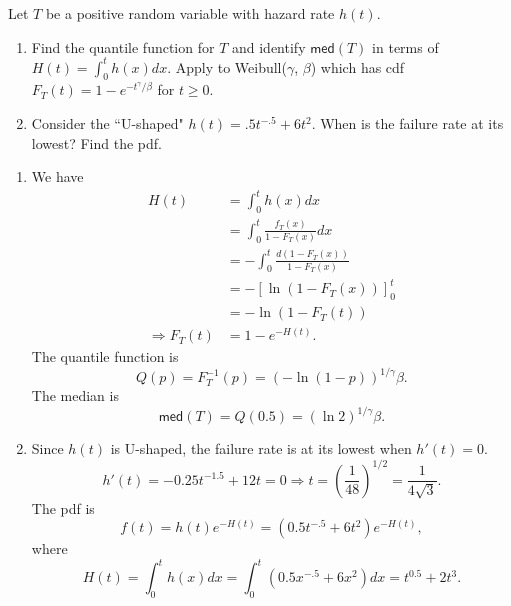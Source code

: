 \documentclass[12pt]{article}
\newenvironment{problem}[2][Problem]{\begin{trivlist}
\item[\hskip \labelsep {\bfseries #1}\hskip \labelsep {\bfseries #2.}]}
{\end{trivlist}}
\begin{document}
\begin{problem}{3}
  Let $T$ be a positive random variable with hazard rate $h(t)$.
  \begin{enumerate}
    \item Find the quantile function for $T$ and identify 
    $\mathsf{med}(T)$ in terms of $H(t) = \int_0^t h(x)dx$.
    Apply to Weibull($\gamma$, $\beta$) which has cdf 
    $F_T(t) = 1 - e^{-t^{\gamma} / \beta}$ for $t \geq 0$.
    \item Consider the ``U-shaped" $h(t) = .5t^{-.5} + 6t^2$. 
    When is the failure rate at its lowest? Find
    the pdf.
  \end{enumerate}

  \begin{enumerate}
    \item We have
    \[
      \begin{aligned}
        H(t) &= \int_0^t h(x) dx\\
        &= \int_0^t \frac{f_T(x)}{1 - F_T(x)} dx \\
        &= -\int_0^t \frac{d(1 - F_T(x))}{1 - F_T(x)} \\
        &= -\left[ \ln(1 - F_T(x)) \right]_0^t \\ 
        &= -\ln(1 - F_T(t)) \\
        \Rightarrow F_T(t) &= 1 - e^{-H(t)}.
      \end{aligned}
    \]
    The quantile function is
    \[
      Q(p) = F_T^{-1}(p) = \left( -\ln(1 - p) \right)^{1/\gamma} \beta.
    \]
    The median is
    \[
      \mathsf{med}(T) = Q(0.5) = (\ln 2)^{1/\gamma} \beta.
    \]
    \item Since $h(t)$ is U-shaped, the failure rate is at its lowest 
    when $h'(t) = 0$.
    \[
      h'(t) = -0.25 t^{-1.5} + 12t = 0 \Rightarrow t = \left( \frac{1}{48} 
      \right)^{1/2} = \frac{1}{4\sqrt{3}}.
    \]
    The pdf is
    \[
      f(t) = h(t) e^{-H(t)} = \left( 0.5t^{-.5} + 6t^2 \right) e^{-H(t)},
    \]
    where
    \[
      H(t) = \int_0^t h(x) dx = \int_0^t \left( 0.5x^{-.5} + 6x^2 \right) dx 
      = t^{0.5} + 2t^3.
    \]
  \end{enumerate}
\end{problem}
\end{document}
